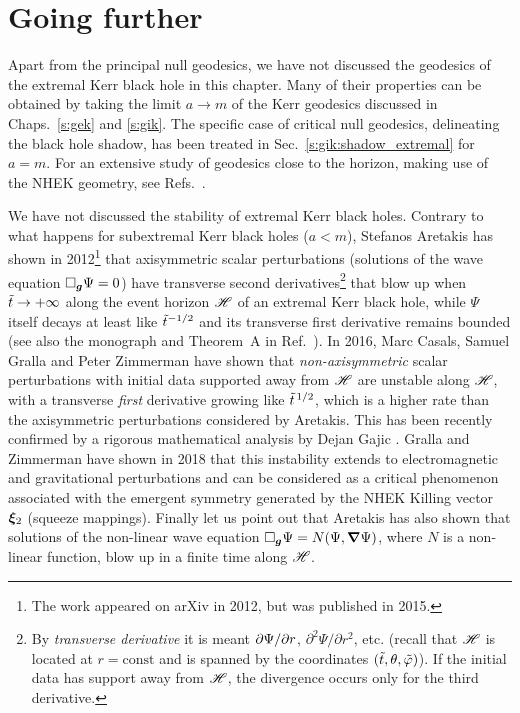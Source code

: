 \section{Going further}

Apart from the principal null geodesics, we have not discussed the geodesics
of the extremal Kerr black hole in this chapter. Many of their properties
can be obtained by taking the limit $a\to m$ of the Kerr geodesics discussed
in Chaps.~\ref{s:gek} and \ref{s:gik}. The specific case of critical null
geodesics, delineating the black hole shadow, has been treated in Sec.~\ref{s:gik:shadow_extremal}
for $a=m$.
For an extensive study of geodesics close to the horizon, making use of the NHEK geometry,
see Refs.~\cite{KapecL20,CompeD20}.

We have not discussed the stability of extremal Kerr black holes.
Contrary to what happens for subextremal Kerr black holes ($a<m$),
Stefanos Aretakis has shown in 2012\footnote{The work \cite{Areta15} appeared
on arXiv in 2012, but was published in 2015.} that axisymmetric scalar perturbations
(solutions of the wave equation $\Box_{\bm{g}} \Psi = 0$)  have transverse second derivatives\footnote{By \emph{transverse derivative}
it is meant ${\partial \Psi}/{\partial r}$, ${\partial^2\Psi/\partial r^2}$, etc. (recall that
$\mathscr{H}$ is located at $r=\mathrm{const}$ and is spanned by the coordinates $({\tilde t},\theta,{\tilde\varphi})$).
If the initial data has support away from $\mathscr{H}$, the divergence occurs only
for the third derivative.}
that blow up when ${\tilde t}\to+\infty$ along the event horizon $\mathscr{H}$ of an extremal Kerr black hole,
while $\Psi$ itself decays at least like ${\tilde t}^{-1/2}$ and its transverse first derivative
remains bounded \cite{Areta15}
(see also the monograph \cite{Areta18} and Theorem~A in Ref.~\cite{Gajic23}).
In 2016, Marc Casals, Samuel Gralla
and Peter Zimmerman \cite{CasalGZ16} have shown that
\emph{non-axisymmetric} scalar perturbations with initial data supported away from $\mathscr{H}$
are unstable along $\mathscr{H}$, with a transverse \emph{first} derivative
growing like ${{\tilde t}}^{\,1/2}$, which is a higher rate than the axisymmetric perturbations considered by
Aretakis. This has been recently confirmed by a rigorous mathematical analysis by
Dejan Gajic \cite{Gajic23}.
Gralla and Zimmerman have shown in 2018 \cite{GrallZ18} that this instability extends to
electromagnetic and gravitational perturbations and can be considered as a critical phenomenon associated with the
emergent symmetry generated by the NHEK Killing vector $\bm{\xi}_2$
(squeeze mappings).
Finally let us point out that
Aretakis \cite{Areta13} has also shown that solutions of the non-linear wave equation $\Box_{\bm{g}}\Psi = N(\Psi,\bm{\nabla}\Psi)$, where  $N$ is a non-linear function,
blow up in a finite time along $\mathscr{H}$.










